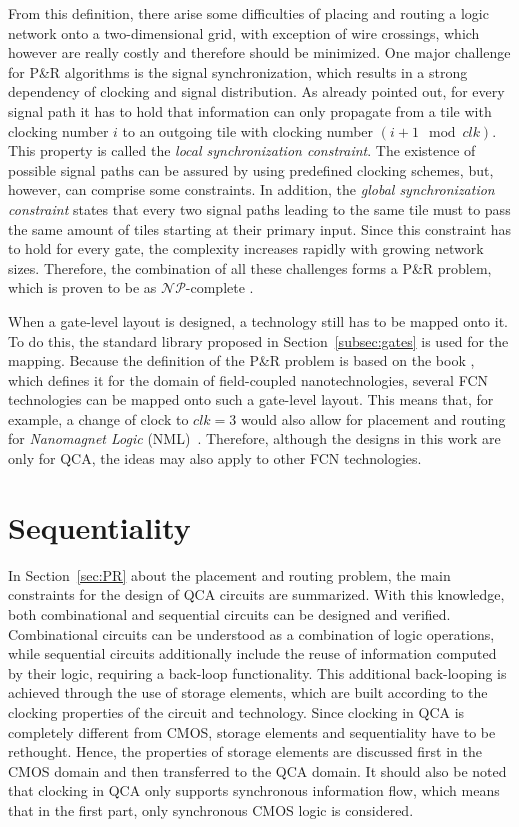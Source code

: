 From this definition, there arise some difficulties of placing and routing a logic network onto a two-dimensional grid, with exception of wire crossings, which however are really costly and therefore should be minimized. One major challenge for P\&R algorithms is the signal synchronization, which results in a strong dependency of clocking and signal distribution. As already pointed out, for every signal path it has to hold that information can only propagate from a tile with clocking number $i$ to an outgoing tile with clocking number $(i+1 \mod clk)$. This property is called the \textit{local synchronization constraint}. The existence of possible signal paths can be assured by using predefined clocking schemes, but, however, can comprise some constraints. In addition, the \textit{global synchronization constraint} states that every two signal paths leading to the same tile must to pass the same amount of tiles starting at their primary input. Since this constraint has to hold for every gate, the complexity increases rapidly with growing network sizes. Therefore, the combination of all these challenges forms a P\&R problem, which is proven to be as $\mathcal{NP}$-complete \cite{NP-hard}.

When a gate-level layout is designed, a technology still has to be mapped onto it. To do this, the standard library proposed in Section~\ref{subsec:gates} is used for the mapping. Because the definition of the P\&R problem is based on the book \cite{Walter}, which defines it for the domain of field-coupled nanotechnologies, several FCN technologies can be mapped onto such a gate-level layout. This means that, for example, a change of clock to $clk = 3$ would also allow for placement and routing for \textit{Nanomagnet Logic} (NML)~\cite{turvani2014physical}. Therefore, although the designs in this work are only for QCA, the ideas may also apply to other FCN technologies.

\section{Sequentiality}\label{subsec:latchesandregisters}

In Section~\ref{sec:PR} about the placement and routing problem, the main constraints for the design of QCA circuits are summarized. With this knowledge, both combinational and sequential circuits can be designed and verified. Combinational circuits can be understood as a combination of logic operations, while sequential circuits additionally include the reuse of information computed by their logic, requiring a back-loop functionality. This additional back-looping is achieved through the use of storage elements, which are built according to the clocking properties of the circuit and technology. Since clocking in QCA is completely different from CMOS, storage elements and sequentiality have to be rethought. Hence, the properties of storage elements are discussed first in the CMOS domain and then transferred to the QCA domain. It should also be noted that clocking in QCA only supports synchronous information flow, which means that in the first part, only synchronous CMOS logic is considered.

